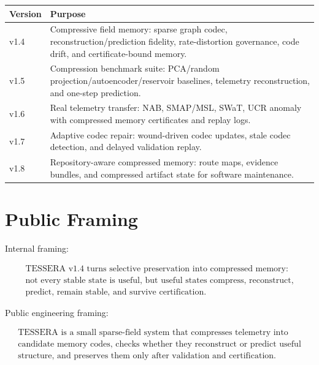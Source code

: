 \documentclass[12pt]{article}
\begin{document}
\begin{longtable}{p{}p{}}
\toprule
\textbf{Version} & \textbf{Purpose} \\
\midrule
v1.4 & Compressive field memory: sparse graph codec, reconstruction/prediction
fidelity, rate-distortion governance, code drift, and certificate-bound memory. \\
v1.5 & Compression benchmark suite: PCA/random projection/autoencoder/reservoir
baselines, telemetry reconstruction, and one-step prediction. \\
v1.6 & Real telemetry transfer: NAB, SMAP/MSL, SWaT, UCR anomaly with compressed
memory certificates and replay logs. \\
v1.7 & Adaptive codec repair: wound-driven codec updates, stale codec detection,
and delayed validation replay. \\
v1.8 & Repository-aware compressed memory: route maps, evidence bundles, and
compressed artifact state for software maintenance. \\
\bottomrule
\end{longtable}

\section{Public Framing}

Internal framing:

\[
\boxed{
\begin{gathered}
\text{TESSERA v1.4 turns selective preservation into compressed memory:}\\
\text{not every stable state is useful, but useful states compress, reconstruct,}\\
\text{predict, remain stable, and survive certification.}
\end{gathered}
}
\]

Public engineering framing:

\[
\boxed{
\begin{gathered}
\text{TESSERA is a small sparse-field system that compresses telemetry into}\\
\text{candidate memory codes, checks whether they reconstruct or predict useful}\\
\text{structure, and preserves them only after validation and certification.}
\end{gathered}
}
\]
\end{document}
